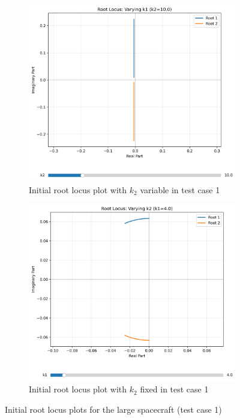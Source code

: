 \documentclass{ifacconf}
\begin{document}
\begin{figure}[H]
    \centering
    \begin{subfigure}[b]{0.48\columnwidth}
        \centering
        \includegraphics[width=\linewidth]{root_locus/base_k1__root_locus(1).pdf}
        \caption{Initial root locus plot with $k_2$ variable in test case 1}
        \label{fig:subfig1}
    \end{subfigure}
    \hfill
    \begin{subfigure}[b]{0.48\columnwidth}
        \centering
        \includegraphics[width=\linewidth]{root_locus/base_k2_root_locus(1).pdf}
        \caption{Initial root locus plot with $k_2$ fixed in test case 1}
        \label{fig:subfig2}
    \end{subfigure}
    \caption{Initial root locus plots for the large spacecraft (test case 1)}
    \label{fig:combined}
\end{figure}
\end{document}

